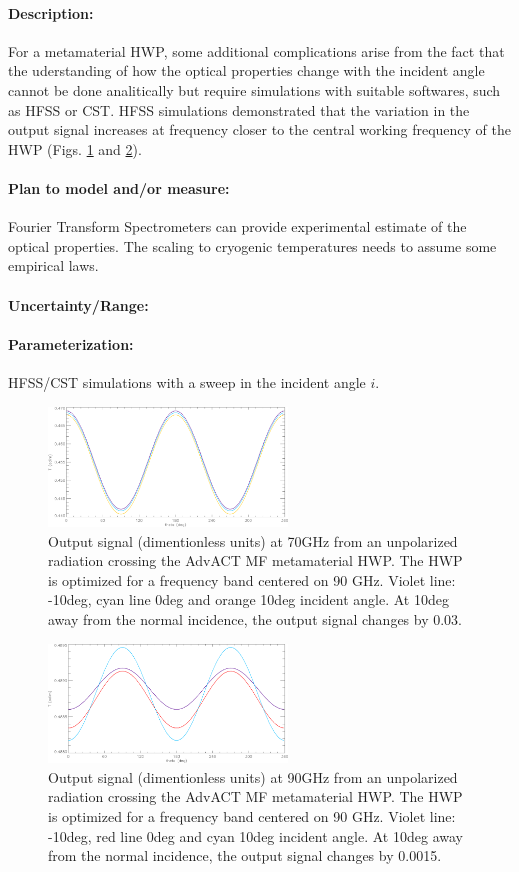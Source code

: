 \paragraph{Description:}
For a metamaterial HWP, some additional complications arise from the fact that the uderstanding of how the optical properties change with the
incident angle cannot be done analitically but require simulations with suitable softwares, such as HFSS or CST.
HFSS simulations demonstrated that the variation in the output signal increases at frequency closer to the central working frequency of the
HWP (Figs. \ref{meta1} and \ref{meta2}).

\paragraph{Plan to model and/or measure:}
Fourier Transform Spectrometers can provide experimental estimate of the optical properties. The scaling to cryogenic temperatures 
needs to assume some empirical laws.

\paragraph{Uncertainty/Range:}


\paragraph{Parameterization:}
HFSS/CST simulations with a sweep in the incident angle $i$.

\begin{figure}
\centering
\includegraphics[width=2.5in]{figures/meta1.png}
\caption{Output signal (dimentionless units) at 70GHz from an unpolarized radiation crossing the AdvACT MF metamaterial HWP. The HWP is optimized for a frequency band centered
on 90 GHz. Violet line: -10deg, cyan line 0deg and orange 10deg incident angle. At 10deg away from the normal incidence, the output signal
changes by 0.03.}\label{meta1}
\end{figure}

\begin{figure}
\centering
\includegraphics[width=2.5in]{figures/meta2.png}
\caption{Output signal (dimentionless units) at 90GHz from an unpolarized radiation crossing the AdvACT MF metamaterial HWP. The HWP is optimized for a frequency band centered
on 90 GHz. Violet line: -10deg, red line 0deg and cyan 10deg incident angle. At 10deg away from the normal incidence, the output signal
changes by 0.0015.}\label{meta2}
\end{figure}
